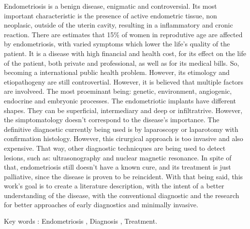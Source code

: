\documentclass[12pt]{article} %
\begin{document}
Endometriosis is a benign disease, enigmatic and controversial.  Its
most important characteristic is the presence of active endometric
tissue, non neoplasic, outside of the uterin cavity, resulting in a
inflammatory and cronic reaction.
There are estimates that 15\% of women in reprodutive age are affected
by endometriosis, with varied symptoms which lower the life's quality
of the patient. It is a disease with high financial and health cost,
for its effect on the life of the patient, both private and
professional, as well as for its medical bills. So, becoming a
international public health problem.
However, its etimology and etiopathogeny are still
controvertial. However, it is believed that multiple factors are
involveed. The most proeminant being: genetic, environment,
angiogenic, endocrine and embryonic processes.
The endometriotic implants have different shapes. They can be
superficial, intermediary and deep or infiltratrive. However, the
simptomatology doesn't correspond to the disease's importance.
The definitive diagnostic currently being used is by laparoscopy or
laparotomy with confirmation histology. However, this cirurgical
approach is too invasive and also expensive. That way, other
diagnostic technicques are being used to detect lesions, such as:
ultrasonography and nuclear magnetic resonance.
In spite of that, endometriosis still doesn't have a known cure, and
its treatment is just palliative, since the disease is proven
to be reincident.
With that being said, this work's goal is to create a literature
description, with the intent of a better understanding of the disease,
with the conventional diagnostic and the research for better
approaches of early diagnostics and minimally invasive.

Key words  : Endometriosis , Diagnosis , Treatment.

\newpage

\listoffigures
{} \selectfont




\newpage

\tableofcontents
{} \selectfont


\newpage








\newpage
\end{document}
